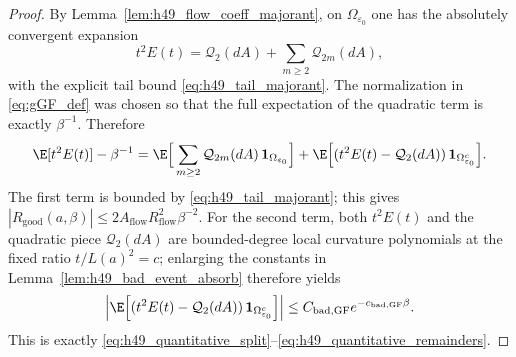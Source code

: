 \begin{proof}
By Lemma~\ref{lem:h49_flow_coeff_majorant}, on $\Omega_{\varepsilon_0}$ one has the absolutely convergent expansion
\[
 t^2E(t)=\mathcal Q_2(dA)+\sum_{m\ge 2}\mathcal Q_{2m}(dA),
\]
with the explicit tail bound \eqref{eq:h49_tail_majorant}.
The normalization in \eqref{eq:gGF_def} was chosen so that the full expectation of the quadratic term is exactly $\beta^{-1}$.
Therefore
\[
\E[t^2E(t)]-\beta^{-1}
=
\E\Big[\sum_{m\ge 2}\mathcal Q_{2m}(dA)\,\mathbf 1_{\Omega_{\varepsilon_0}}\Big]
+\E\Big[(t^2E(t)-\mathcal Q_2(dA))\,\mathbf 1_{\Omega_{\varepsilon_0}^c}\Big].
\]
The first term is bounded by \eqref{eq:h49_tail_majorant}; this gives $|R_{\mathrm{good}}(a,\beta)|\le 2A_{\mathrm{flow}}R_{\mathrm{flow}}^2\beta^{-2}$.
For the second term, both $t^2E(t)$ and the quadratic piece $\mathcal Q_2(dA)$ are bounded-degree local curvature polynomials at the fixed ratio $t/L(a)^2=c$; enlarging the constants in Lemma~\ref{lem:h49_bad_event_absorb} therefore yields
\[
\Big|\E\Big[(t^2E(t)-\mathcal Q_2(dA))\,\mathbf 1_{\Omega_{\varepsilon_0}^c}\Big]\Big|
\le C_{\mathrm{bad,GF}}e^{-c_{\mathrm{bad,GF}}\beta}.
\]
This is exactly \eqref{eq:h49_quantitative_split}--\eqref{eq:h49_quantitative_remainders}.
\end{proof}

